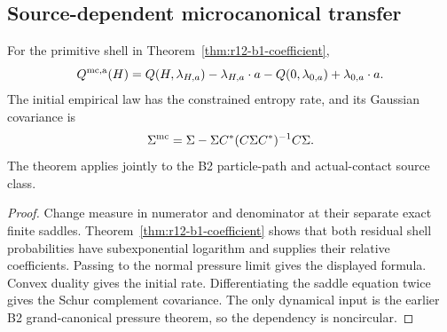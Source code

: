 \subsection{Source-dependent microcanonical transfer}

\begin{theorem}
\label{thm:r12-b1-main}
For the primitive shell in Theorem~\ref{thm:r12-b1-coefficient},
\[
 Q^{\rm mc,a}(H)=
 Q(H,\lambda_{H,a})-\lambda_{H,a}\cdot a
 -Q(0,\lambda_{0,a})+\lambda_{0,a}\cdot a.
\]
The initial empirical law has the constrained entropy rate, and its Gaussian
covariance is
\[
 \Sigma^{\rm mc}=\Sigma-
 \Sigma C^*(C\Sigma C^*)^{-1}C\Sigma.
\]
The theorem applies jointly to the B2 particle-path and actual-contact source
class.
\end{theorem}

\begin{proof}
Change measure in numerator and denominator at their separate exact finite
saddles.  Theorem~\ref{thm:r12-b1-coefficient} shows that both residual shell
probabilities have subexponential logarithm and supplies their relative
coefficients.  Passing to the normal pressure limit gives the displayed
formula.  Convex duality gives the initial rate.  Differentiating the saddle
equation twice gives the Schur complement covariance.  The only dynamical
input is the earlier B2 grand-canonical pressure theorem, so the dependency is
noncircular.
\end{proof}
